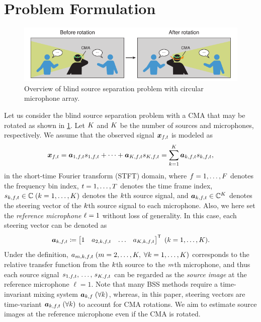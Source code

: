 \documentclass[sip,biber]{now-journal}
\begin{document}
\section{Problem Formulation}\label{sec:problem}
\begin{figure}[t]
  \centering
  \includegraphics{figures/diagrams/bss.pdf}%
  \caption{Overview of blind source separation problem with circular microphone array.}%
  \label{fig:bss}
\end{figure}
Let us consider the blind source separation problem with a CMA that may be rotated as shown in \cref{fig:bss}.
Let $K$ and $K$ be the number of sources and microphones, respectively.
We assume that the observed signal $\Obs _{\ft}$ is modeled as
\begin{equation}
  \Obs _{\ft} = \steer _{1,\ft} \sig _{1,\ft} + \dots + \steer _{\Src,\ft} \sig _{\Src,\ft} = \sum _{\src=1} ^{\Src} \steer _{\src,\ft} \sig _{\src,\ft},\label{eq:mix}
\end{equation}
in the short-time Fourier transform (STFT) domain,
where $f = 1, \dots, F$ denotes the frequency bin index,
$t = 1, \dots, T$ denotes the time frame index,
$\sig _{\src,\ft} \in \C\; (\src = 1, \dots, \Src)$ denotes the $k$th source signal,
and $\steer _{\src,\ft} \in \C ^{\Mic}$ denotes the steering vector of the $k$th source signal to each microphone.
Also, we here set the \emph{reference microphone} $\ell = 1$ without loss of generality.
In this case, each steering vector can be denoted as
\begin{equation}
  \steer _{\src,\ft} \coloneqq \begin{bmatrix} 1 & \str _{2,\src,\ft} & \dots & \str _{\Mic,\src,\ft} \end{bmatrix} ^{\top}\; (\src = 1, \dots, \Src).
\end{equation}
Under the definition, $\str _{\mic,\src,\ft} \; (\mic = 2, \dots, \Mic,\; \forall \src = 1, \dots, \Src)$ corresponds to the relative transfer function from the $k$th source to the $m$th microphone, and thus each source signal $\sig _{1,\ft},\, \dots,\, \sig _{\Src,\ft}$ can be regarded as the \emph{source image} at the reference microphone $\ell = 1$.
Note that many BSS methods require a time-invariant mixing system $\bm{a} _{k,f}\; (\forall k)$,
whereas, in this paper, steering vectors are time-variant $\steer _{\src,\ft}\; (\forall \src)$ to account for CMA rotations.
We aim to estimate source images at the reference microphone even if the CMA is rotated.
\end{document}
